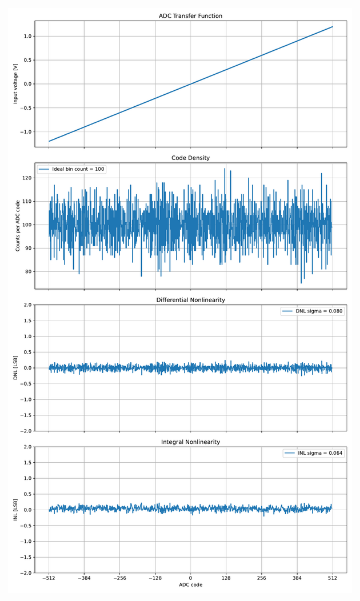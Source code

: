 \documentclass[varwidth]{standalone}
\begin{document}
\begin{figure}
  \begin{subfigure}{0.32\textwidth}
    \includegraphics[width=\textwidth]{nonlinearity.pdf}
  \end{subfigure}
  \begin{subfigure}{0.32\textwidth}

\end{subfigure}
\end{figure}
\end{document}
